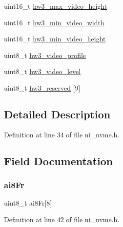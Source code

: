 \begin{DoxyCompactItemize}
\item 
uint16\+\_\+t \mbox{\hyperlink{struct__ni__nvme__identify_a25c0496f53665e019d0fbf9d6fd79602}{hw3\+\_\+max\+\_\+video\+\_\+height}}
\item 
uint16\+\_\+t \mbox{\hyperlink{struct__ni__nvme__identify_ab880121942c4fb5ea3ebe5bb36ff3f6a}{hw3\+\_\+min\+\_\+video\+\_\+width}}
\item 
uint16\+\_\+t \mbox{\hyperlink{struct__ni__nvme__identify_a284819ea995ce1af29a2a2ad75ac3ad7}{hw3\+\_\+min\+\_\+video\+\_\+height}}
\item 
uint8\+\_\+t \mbox{\hyperlink{struct__ni__nvme__identify_ae1093e04892a1c04a142d85ed7ebcc1f}{hw3\+\_\+video\+\_\+profile}}
\item 
uint8\+\_\+t \mbox{\hyperlink{struct__ni__nvme__identify_a8a7b032305218f9e87033ad7da91db93}{hw3\+\_\+video\+\_\+level}}
\item 
uint8\+\_\+t \mbox{\hyperlink{struct__ni__nvme__identify_a521f6dfed46071eef4dbe307bf8b7675}{hw3\+\_\+reserved}} \mbox{[}9\mbox{]}
\end{DoxyCompactItemize}


\subsection{Detailed Description}


Definition at line 34 of file ni\+\_\+nvme.\+h.



\subsection{Field Documentation}
\mbox{\label{struct__ni__nvme__identify_a05e4d990aa51cdd4e78b909dd8e3dc81}} 
\subsubsection{\texorpdfstring{ai8Fr}{ai8Fr}}
{\footnotesize\ttfamily uint8\+\_\+t ai8\+Fr\mbox{[}8\mbox{]}}



Definition at line 42 of file ni\+\_\+nvme.\+h.

\mbox{\label{struct__ni__nvme__identify_afd3a2dfe95be0aabd1608bb7c62149ef}} 
